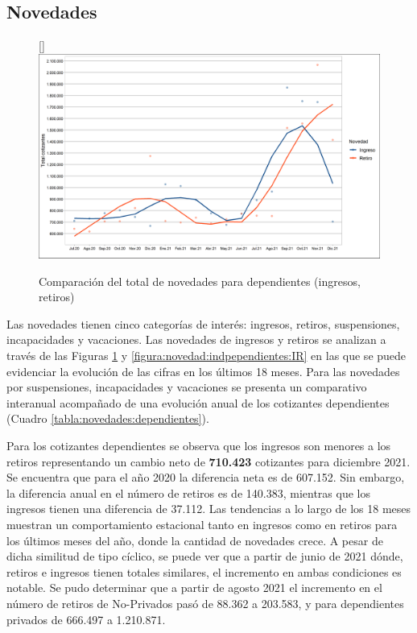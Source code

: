 \vspace{0.5cm}
\subsection{Novedades}
\begin{figure}
\raisebox{0pt}[\dimexpr{}\baselineskip\relax]{\includegraphics[width = 11.5cm]{figures/01_dinamica/total_novedades_dependientes_ingret.png}}
\caption{Comparación del total de novedades para dependientes (ingresos, retiros)}
\label{figura:novedad:sectorprivado:IR}
\end{figure}

Las novedades tienen cinco categorías de interés: ingresos, retiros, suspensiones, incapacidades y vacaciones. Las novedades de ingresos y retiros se analizan a través de las Figuras \ref{figura:novedad:sectorprivado:IR} y \ref{figura:novedad:indpependientes:IR} en las que se puede evidenciar la evolución de las cifras en los últimos 18 meses. Para las novedades por suspensiones, incapacidades y vacaciones se presenta un comparativo interanual acompañado de una evolución anual de los cotizantes dependientes (Cuadro \ref{tabla:novedades:dependientes}). 


Para los cotizantes dependientes se observa que los ingresos son menores a los retiros representando un cambio neto de \textbf{710.423} cotizantes para diciembre 2021. Se encuentra que para el año 2020 la diferencia neta es de 607.152. Sin embargo, la diferencia anual en el número de retiros es de 140.383, mientras que los ingresos tienen una diferencia de 37.112. Las tendencias a lo largo de los 18 meses muestran un comportamiento estacional tanto en ingresos como en retiros para los últimos meses del año, donde la cantidad de novedades crece. A pesar de dicha similitud de tipo cíclico, se puede ver que a partir de junio de 2021 dónde, retiros e ingresos tienen totales similares, el incremento en ambas condiciones es notable. Se pudo determinar que a partir de agosto 2021 el incremento en el número de retiros de No-Privados pasó de 88.362 a 203.583, y para dependientes privados de 666.497 a 1.210.871. 


